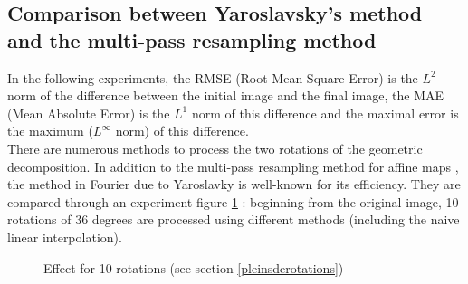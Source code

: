 
\subsection{Comparison between Yaroslavsky's method and the multi-pass resampling method}

	In the following experiments, the RMSE (Root Mean Square Error) is the $L^2$ norm of the difference between the initial image and the final image, the MAE (Mean Absolute Error) is the $L^1$ norm of this difference and the maximal error is the maximum ($L^\infty$ norm) of this difference.\\


There are numerous methods to process the two rotations of the geometric decomposition. In addition to the multi-pass resampling method for affine maps \cite{szeliski2010high}, the method in Fourier due to Yaroslavky \cite{unser1995convolution} is well-known for its efficiency. They are compared through an experiment figure \ref{rotalena} : beginning from the original image, 10 rotations of 36 degrees are processed using different methods (including the naive linear interpolation).

 \begin{figure}[h!]
   \centering
 \caption{Effect for 10 rotations (see section \ref{pleinsderotations})}
 \label{rotalena}
 \end{figure}
 

